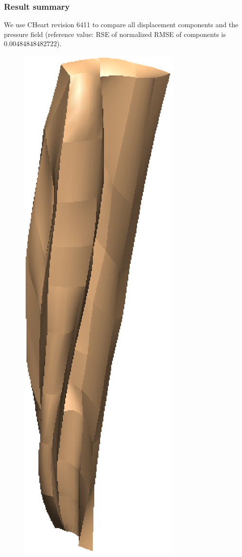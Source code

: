 \subsubsection{Result summary}
%
We use CHeart revision 6411 to compare all displacement components and the
pressure field (reference value: RSE of normalized RMSE of components is
$0.00484848482722$).
%


%
\begin{figure}[h!]
    \centering
    \includegraphics[width=0.49\columnwidth]{examples/example-0204-u/doc/figures/undeformed_geometry.eps}

\end{figure}
